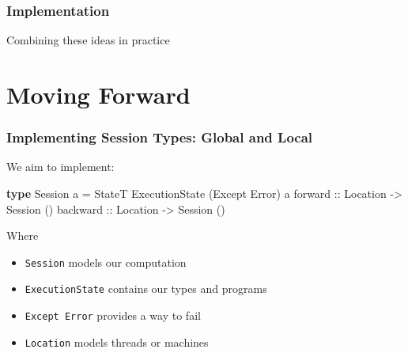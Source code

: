 \documentclass[12pt]{beamer}
\newenvironment{Shaded}{}{}
\newcommand{\KeywordTok}[1]{\textcolor[rgb]{0.00,0.44,0.13}{\textbf{#1}}}
\newcommand{\DataTypeTok}[1]{\textcolor[rgb]{0.56,0.13,0.00}{#1}}
\newcommand{\OtherTok}[1]{\textcolor[rgb]{0.00,0.44,0.13}{#1}}
\newcommand{\FunctionTok}[1]{\textcolor[rgb]{0.02,0.16,0.49}{#1}}
\newcommand{\NormalTok}[1]{#1}
\begin{document}
\begin{frame}[fragile]
\frametitle{Implementation}

\begin{center}
    \Large{Combining these ideas in practice}
\end{center}
\end{frame}


\section{Moving Forward}



\begin{frame}[fragile]
\frametitle{Implementing Session Types: Global and Local}

We aim to implement: 
\begin{Shaded}
\begin{Highlighting}[]
\KeywordTok{type} \DataTypeTok{Session} \NormalTok{a }\FunctionTok{=} \DataTypeTok{StateT} \DataTypeTok{ExecutionState} \NormalTok{(}\DataTypeTok{Except} \DataTypeTok{Error}\NormalTok{) a}
\OtherTok{forward  ::} \DataTypeTok{Location} \OtherTok{->} \DataTypeTok{Session} \NormalTok{()}
\OtherTok{backward ::} \DataTypeTok{Location} \OtherTok{->} \DataTypeTok{Session} \NormalTok{()}
\end{Highlighting}
\end{Shaded}

Where 

\begin{itemize}
    \item \texttt{Session} models our computation
    \item \texttt{ExecutionState} contains our types and programs 
    \item \texttt{Except Error} provides a way to fail
    \item \texttt{Location} models threads or machines 
\end{itemize}




\end{frame}
\end{document}
